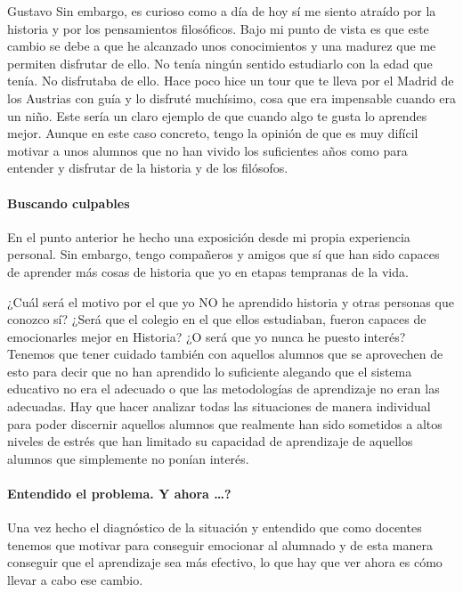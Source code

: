 \begin{opin}{\guscolor}{Gustavo}
Sin embargo, es curioso como a día de hoy sí me siento atraído por la historia y por los pensamientos filosóficos. Bajo mi punto de vista es que este cambio se debe a que he alcanzado unos conocimientos y una madurez que me permiten disfrutar de ello. No tenía ningún sentido estudiarlo con la edad que tenía. No disfrutaba de ello. Hace poco hice un tour que te lleva por el Madrid de los Austrias con guía y lo disfruté muchísimo, cosa que era impensable cuando era un niño. Este sería un claro ejemplo de que cuando algo te gusta lo aprendes mejor. Aunque en este caso concreto, tengo la opinión de que es muy difícil motivar a unos alumnos que no han vivido los suficientes años como para entender y disfrutar de la historia y de los filósofos.


\paragraph{Buscando culpables}
En el punto anterior he hecho una exposición desde mi propia experiencia personal. Sin embargo, tengo compañeros y amigos que sí que han sido capaces de aprender más cosas de historia que yo en etapas tempranas de la vida.


¿Cuál será el motivo por el que yo NO he aprendido historia y otras personas que conozco sí? 
¿Será que el colegio en el que ellos estudiaban, fueron capaces de emocionarles mejor en Historia? 
¿O será que yo nunca he puesto interés? 
Tenemos que tener cuidado también con aquellos alumnos que se aprovechen de esto para decir que no han aprendido lo suficiente alegando que el sistema educativo no era el adecuado o que las metodologías de aprendizaje no eran las adecuadas. Hay que hacer analizar todas las situaciones de manera individual para poder discernir aquellos alumnos que realmente han sido sometidos a altos niveles de estrés que han limitado su capacidad de aprendizaje de aquellos alumnos que simplemente no ponían interés.


\paragraph{Entendido el problema. Y ahora …?}
Una vez hecho el diagnóstico de la situación y entendido que como docentes tenemos que motivar para conseguir emocionar al alumnado y de esta manera conseguir que el aprendizaje sea más efectivo, lo que hay que ver ahora es cómo llevar a cabo ese cambio.



\end{opin}
